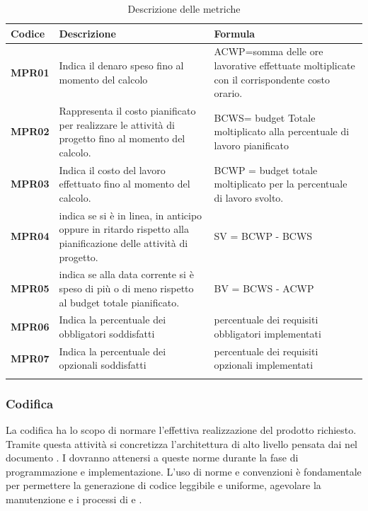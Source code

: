 	\setlength{\freewidth}{\dimexpr\textwidth-0\tabcolsep}
	\renewcommand{\arraystretch}{1.5}
	\setlength{\aboverulesep}{0pt}
	\setlength{\belowrulesep}{0pt}
	\begin{longtable}{L{.10\freewidth} L{.5\freewidth} L{.250\freewidth}}
		\textbf{Codice} & \textbf{Descrizione} & \textbf{Formula}\\
		\toprule
		\endhead		
		\textbf{MPR01} & Indica il denaro speso fino al momento del calcolo & ACWP=somma delle ore lavorative effettuate moltiplicate con il corrispondente costo orario.\\
		\textbf{MPR02} & Rappresenta il costo pianificato per realizzare le attività di progetto fino al momento del calcolo. & BCWS= budget Totale moltiplicato alla percentuale di lavoro pianificato\\
		\textbf{MPR03} & Indica il costo del lavoro effettuato fino al momento del calcolo. & BCWP = budget totale moltiplicato per la percentuale di lavoro svolto.\\
		\textbf{MPR04} & indica se si è in linea, in anticipo oppure in ritardo rispetto alla pianificazione delle attività di progetto. & SV = BCWP - BCWS\\
		\textbf{MPR05} & indica se alla data corrente si è speso di più o di meno rispetto al budget totale pianificato. & BV = BCWS - ACWP\\
		\textbf{MPR06} & Indica la percentuale dei  obbligatori soddisfatti & percentuale dei requisiti obbligatori implementati\\
		\textbf{MPR07} & Indica la percentuale dei  opzionali soddisfatti & percentuale dei requisiti opzionali implementati\\
		\bottomrule
		\hiderowcolors
		\caption{Descrizione delle metriche}\\
	\end{longtable}



\subsubsection{Codifica}
La codifica ha lo scopo di normare l'effettiva realizzazione del prodotto  richiesto. Tramite questa attività si concretizza l'architettura di alto livello pensata dai \progs{} nel documento \PdQ{}. I \progrs{} dovranno attenersi a queste norme durante la fase di programmazione e implementazione. L'uso di norme e convenzioni è fondamentale per permettere la generazione di codice leggibile e uniforme, agevolare la manutenzione e i processi di  e .
